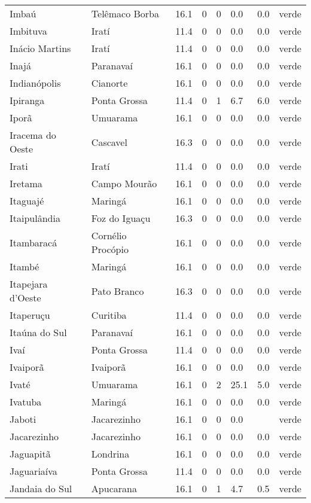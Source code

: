 \begin{longtable}{l|lllllll}
  Imbaú & Telêmaco Borba & 16.1 & 0 & 0 & 0.0 & 0.0 & verde \\ 
  Imbituva & Iratí & 11.4 & 0 & 0 & 0.0 & 0.0 & verde \\ 
  Inácio Martins & Iratí & 11.4 & 0 & 0 & 0.0 & 0.0 & verde \\ 
  Inajá & Paranavaí & 16.1 & 0 & 0 & 0.0 & 0.0 & verde \\ 
  Indianópolis & Cianorte & 16.1 & 0 & 0 & 0.0 & 0.0 & verde \\ 
  Ipiranga & Ponta Grossa & 11.4 & 0 & 1 & 6.7 & 6.0 & verde \\ 
  Iporã & Umuarama & 16.1 & 0 & 0 & 0.0 & 0.0 & verde \\ 
  Iracema do Oeste & Cascavel & 16.3 & 0 & 0 & 0.0 & 0.0 & verde \\ 
  Irati & Iratí & 11.4 & 0 & 0 & 0.0 & 0.0 & verde \\ 
  Iretama & Campo Mourão & 16.1 & 0 & 0 & 0.0 & 0.0 & verde \\ 
  Itaguajé & Maringá & 16.1 & 0 & 0 & 0.0 & 0.0 & verde \\ 
  Itaipulândia & Foz do Iguaçu & 16.3 & 0 & 0 & 0.0 & 0.0 & verde \\ 
  Itambaracá & Cornélio Procópio & 16.1 & 0 & 0 & 0.0 & 0.0 & verde \\ 
  Itambé & Maringá & 16.1 & 0 & 0 & 0.0 & 0.0 & verde \\ 
  Itapejara d'Oeste & Pato Branco & 16.3 & 0 & 0 & 0.0 & 0.0 & verde \\ 
  Itaperuçu & Curitiba & 11.4 & 0 & 0 & 0.0 & 0.0 & verde \\ 
  Itaúna do Sul & Paranavaí & 16.1 & 0 & 0 & 0.0 & 0.0 & verde \\ 
  Ivaí & Ponta Grossa & 11.4 & 0 & 0 & 0.0 & 0.0 & verde \\ 
  Ivaiporã & Ivaiporã & 16.1 & 0 & 0 & 0.0 & 0.0 & verde \\ 
  Ivaté & Umuarama & 16.1 & 0 & 2 & 25.1 & 5.0 & verde \\ 
  Ivatuba & Maringá & 16.1 & 0 & 0 & 0.0 & 0.0 & verde \\ 
  Jaboti & Jacarezinho & 16.1 & 0 & 0 & 0.0 &  & verde \\ 
  Jacarezinho & Jacarezinho & 16.1 & 0 & 0 & 0.0 & 0.0 & verde \\ 
  Jaguapitã & Londrina & 16.1 & 0 & 0 & 0.0 & 0.0 & verde \\ 
  Jaguariaíva & Ponta Grossa & 11.4 & 0 & 0 & 0.0 & 0.0 & verde \\ 
  Jandaia do Sul & Apucarana & 16.1 & 0 & 1 & 4.7 & 0.5 & verde \\ 

\end{longtable}
